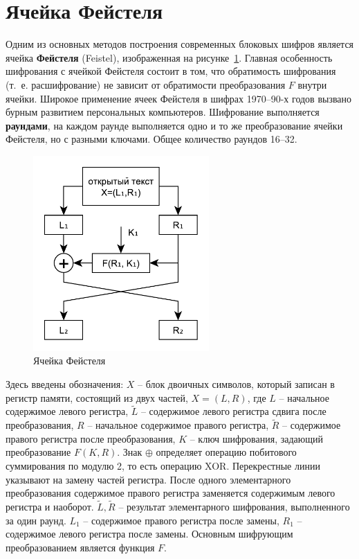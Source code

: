 \section{Ячейка Фейстеля}

Одним из основных методов построения современных блоковых шифров является ячейка \textbf{Фейстеля} (Feistel), изображенная на рисунке~\ref{fig:Feistel}. Главная особенность шифрования с ячейкой Фейстеля состоит в том, что обратимость шифрования (т.~е. расшифрование) не зависит от обратимости преобразования $F$ внутри ячейки. Широкое применение ячеек Фейстеля в шифрах 1970--90-х годов вызвано бурным развитием персональных компьютеров. Шифрование выполняется \textbf{раундами}, на каждом раунде выполняется одно и то же преобразование ячейки Фейстеля, но с разными ключами. Общее количество раундов 16--32.

\begin{figure}[!ht]
    \centering
    \includegraphics[width=0.6\textwidth]{pic/feistel}
    \caption{Ячейка Фейстеля\label{fig:Feistel}}
\end{figure}

Здесь введены обозначения: $X$ -- блок двоичных символов, который записан в регистр памяти, состоящий из двух частей, $X = (L,R)$, где $L$ -- начальное содержимое левого регистра, $\tilde{L}$ -- содержимое левого регистра сдвига после преобразования, $R$ -- начальное содержимое правого регистра, $\tilde{R}$ -- содержимое правого регистра после преобразования, $K$ -- ключ шифрования, задающий преобразование $F(K,R)$. Знак $\oplus$ определяет операцию побитового суммирования по модулю 2, то есть операцию XOR. Перекрестные линии указывают на замену частей регистра. После одного элементарного преобразования содержимое правого регистра заменяется содержимым левого регистра и наоборот. $\tilde{L},\tilde{R}$ -- результат элементарного шифрования, выполненного за один раунд. $L_{1}$ -- содержимое правого регистра после замены, $R_{1}$ -- содержимое левого регистра после замены. Основным шифрующим преобразованием является функция $F$.

